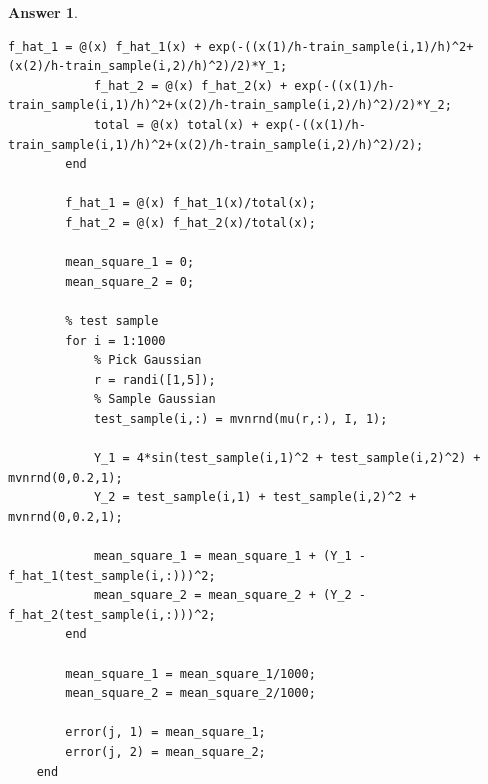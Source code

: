 \documentclass[12pt]{article}
\theoremstyle{colon}
\newtheorem*{answer}{Answer}
\begin{document}
\begin{answer}
\begin{lstlisting}[style=Matlab-editor, basicstyle=\scriptsize]
            f_hat_1 = @(x) f_hat_1(x) + exp(-((x(1)/h-train_sample(i,1)/h)^2+(x(2)/h-train_sample(i,2)/h)^2)/2)*Y_1;
            f_hat_2 = @(x) f_hat_2(x) + exp(-((x(1)/h-train_sample(i,1)/h)^2+(x(2)/h-train_sample(i,2)/h)^2)/2)*Y_2;
            total = @(x) total(x) + exp(-((x(1)/h-train_sample(i,1)/h)^2+(x(2)/h-train_sample(i,2)/h)^2)/2);
        end

        f_hat_1 = @(x) f_hat_1(x)/total(x);
        f_hat_2 = @(x) f_hat_2(x)/total(x);

        mean_square_1 = 0;
        mean_square_2 = 0;

        % test sample
        for i = 1:1000
            % Pick Gaussian
            r = randi([1,5]);
            % Sample Gaussian
            test_sample(i,:) = mvnrnd(mu(r,:), I, 1);

            Y_1 = 4*sin(test_sample(i,1)^2 + test_sample(i,2)^2) + mvnrnd(0,0.2,1);
            Y_2 = test_sample(i,1) + test_sample(i,2)^2 + mvnrnd(0,0.2,1);

            mean_square_1 = mean_square_1 + (Y_1 - f_hat_1(test_sample(i,:)))^2;
            mean_square_2 = mean_square_2 + (Y_2 - f_hat_2(test_sample(i,:)))^2;
        end

        mean_square_1 = mean_square_1/1000;
        mean_square_2 = mean_square_2/1000;

        error(j, 1) = mean_square_1;
        error(j, 2) = mean_square_2;
    end
  \end{lstlisting}
\end{answer}
\end{document}
